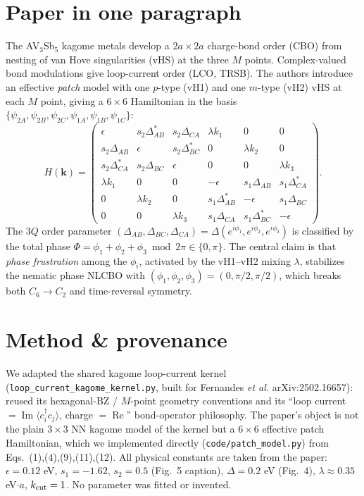\documentclass[11pt]{article}
\begin{document}
\section{Paper in one paragraph}
The AV$_3$Sb$_5$ kagome metals develop a $2a\times2a$ charge-bond order (CBO) from
nesting of van Hove singularities (vHS) at the three $M$ points. Complex-valued bond
modulations give loop-current order (LCO, TRSB). The authors introduce an effective
\emph{patch} model with one $p$-type (vH1) and one $m$-type (vH2) vHS at each $M$
point, giving a $6\times6$ Hamiltonian in the basis
$\{\psi_{2A},\psi_{2B},\psi_{2C},\psi_{1A},\psi_{1B},\psi_{1C}\}$:
\begin{equation}
H(\mathbf k)=
\begin{pmatrix}
\epsilon & s_2\Delta^*_{AB} & s_2\Delta_{CA} & \lambda k_1 & 0 & 0\\
s_2\Delta_{AB} & \epsilon & s_2\Delta^*_{BC} & 0 & \lambda k_2 & 0\\
s_2\Delta^*_{CA} & s_2\Delta_{BC} & \epsilon & 0 & 0 & \lambda k_3\\
\lambda k_1 & 0 & 0 & -\epsilon & s_1\Delta_{AB} & s_1\Delta^*_{CA}\\
0 & \lambda k_2 & 0 & s_1\Delta^*_{AB} & -\epsilon & s_1\Delta_{BC}\\
0 & 0 & \lambda k_3 & s_1\Delta_{CA} & s_1\Delta^*_{BC} & -\epsilon
\end{pmatrix}.
\end{equation}
The $3Q$ order parameter $(\Delta_{AB},\Delta_{BC},\Delta_{CA})=\Delta(e^{i\phi_1},
e^{i\phi_2},e^{i\phi_3})$ is classified by the total phase $\Phi=\phi_1+\phi_2+
\phi_3\bmod2\pi\in\{0,\pi\}$. The central claim is that \emph{phase frustration}
among the $\phi_i$, activated by the vH1--vH2 mixing $\lambda$, stabilizes the
nematic phase NLCBO with $(\phi_1,\phi_2,\phi_3)=(0,\pi/2,\pi/2)$, which breaks
both $C_6\!\to\!C_2$ and time-reversal symmetry.

\section{Method \& provenance}
We adapted the shared kagome loop-current kernel
(\texttt{loop\_current\_kagome\_kernel.py}, built for Fernandes \emph{et al.}
arXiv:2502.16657): reused its hexagonal-BZ / $M$-point geometry conventions and its
``loop current $=\operatorname{Im}\langle c^\dagger_i c_j\rangle$, charge $=
\operatorname{Re}$'' bond-operator philosophy. The paper's object is not the plain
$3\times3$ NN kagome model of the kernel but a $6\times6$ effective patch
Hamiltonian, which we implemented directly (\texttt{code/patch\_model.py}) from
Eqs.~(1),(4),(9),(11),(12). All physical constants are taken from the paper:
$\epsilon=0.12$ eV, $s_1=-1.62$, $s_2=0.5$ (Fig.~5 caption), $\Delta=0.2$ eV
(Fig.~4), $\lambda\approx0.35$ eV$\cdot a$, $k_{\rm cut}=1$. No parameter was
fitted or invented.
\end{document}
